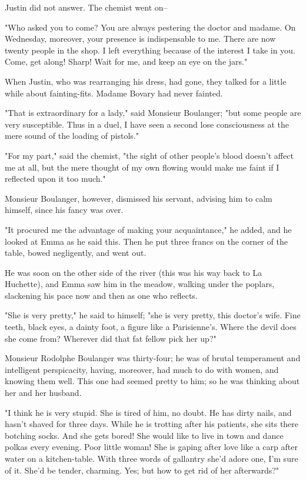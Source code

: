 \documentclass[11pt,twocolumn]{ltugboat}
\begin{document}
Justin did not answer. The chemist went on--

"Who asked you to come? You are always pestering the doctor and madame.
On Wednesday, moreover, your presence is indispensable to me. There are
now twenty people in the shop. I left everything because of the interest
I take in you. Come, get along! Sharp! Wait for me, and keep an eye on
the jars."

When Justin, who was rearranging his dress, had gone, they talked for a
little while about fainting-fits. Madame Bovary had never fainted.

"That is extraordinary for a lady," said Monsieur Boulanger; "but some
people are very susceptible. Thus in a duel, I have seen a second lose
consciousness at the mere sound of the loading of pistols."

"For my part," said the chemist, "the sight of other people's blood
doesn't affect me at all, but the mere thought of my own flowing would
make me faint if I reflected upon it too much."

Monsieur Boulanger, however, dismissed his servant, advising him to calm
himself, since his fancy was over.

"It procured me the advantage of making your acquaintance," he added,
and he looked at Emma as he said this. Then he put three francs on the
corner of the table, bowed negligently, and went out.

He was soon on the other side of the river (this was his way back to La
Huchette), and Emma saw him in the meadow, walking under the poplars,
slackening his pace now and then as one who reflects.

"She is very pretty," he said to himself; "she is very pretty, this
doctor's wife. Fine teeth, black eyes, a dainty foot, a figure like a
Parisienne's. Where the devil does she come from? Wherever did that fat
fellow pick her up?"

Monsieur Rodolphe Boulanger was thirty-four; he was of brutal
temperament and intelligent perspicacity, having, moreover, had much to
do with women, and knowing them well. This one had seemed pretty to him;
so he was thinking about her and her husband.

"I think he is very stupid. She is tired of him, no doubt. He has dirty
nails, and hasn't shaved for three days. While he is trotting after his
patients, she sits there botching socks. And she gets bored! She would
like to live in town and dance polkas every evening. Poor little woman!
She is gaping after love like a carp after water on a kitchen-table.
With three words of gallantry she'd adore one, I'm sure of it. She'd be
tender, charming. Yes; but how to get rid of her afterwards?"
\end{document}

